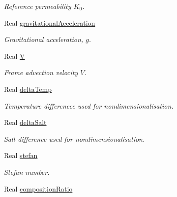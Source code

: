 \begin{DoxyCompactItemize}
\begin{DoxyCompactList}\small\item\em Reference permeability $ K_0 $. \end{DoxyCompactList}\item 
\hypertarget{class_mushy_layer_params_a8ef8bc3509b02356ed98368f5e484771}{Real \hyperlink{class_mushy_layer_params_a8ef8bc3509b02356ed98368f5e484771}{gravitational\-Acceleration}}\label{class_mushy_layer_params_a8ef8bc3509b02356ed98368f5e484771}

\begin{DoxyCompactList}\small\item\em Gravitational acceleration, $ g $. \end{DoxyCompactList}\item 
\hypertarget{class_mushy_layer_params_afa52e49caf853141c99a7505dfa293b6}{Real \hyperlink{class_mushy_layer_params_afa52e49caf853141c99a7505dfa293b6}{V}}\label{class_mushy_layer_params_afa52e49caf853141c99a7505dfa293b6}

\begin{DoxyCompactList}\small\item\em Frame advection velocity $ V $. \end{DoxyCompactList}\item 
Real \hyperlink{class_mushy_layer_params_ae221423b95517958c6a2c7acf5c271c6}{delta\-Temp}
\begin{DoxyCompactList}\small\item\em Temperature differenece used for nondimensionalisation. \end{DoxyCompactList}\item 
Real \hyperlink{class_mushy_layer_params_acea8da7cc75a779bb8dd7967fb3b0586}{delta\-Salt}
\begin{DoxyCompactList}\small\item\em Salt difference used for nondimensionalisation. \end{DoxyCompactList}\item 
Real \hyperlink{class_mushy_layer_params_ae226ddaa8dc0171b6fcb1e5393ef61a4}{stefan}
\begin{DoxyCompactList}\small\item\em Stefan number. \end{DoxyCompactList}\item 
\hypertarget{class_mushy_layer_params_ac97e799b81db331d775928ab31c9080e}{Real \hyperlink{class_mushy_layer_params_ac97e799b81db331d775928ab31c9080e}{composition\-Ratio}}\label{class_mushy_layer_params_ac97e799b81db331d775928ab31c9080e}


\end{DoxyCompactItemize}
